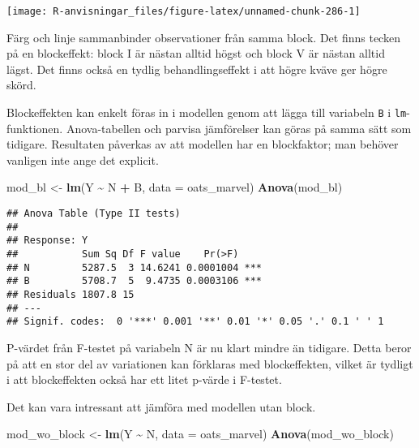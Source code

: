 \documentclass[
]{book}
\newenvironment{Shaded}{\begin{snugshade}}{\end{snugshade}}
\newcommand{\AttributeTok}[1]{\textcolor[rgb]{0.13,0.29,0.53}{#1}}
\newcommand{\FunctionTok}[1]{\textcolor[rgb]{0.13,0.29,0.53}{\textbf{#1}}}
\newcommand{\NormalTok}[1]{#1}
\newcommand{\OtherTok}[1]{\textcolor[rgb]{0.56,0.35,0.01}{#1}}
\newcommand{\SpecialCharTok}[1]{\textcolor[rgb]{0.81,0.36,0.00}{\textbf{#1}}}
\theoremstyle{definition}
\theoremstyle{definition}
\theoremstyle{definition}
\theoremstyle{definition}
\theoremstyle{remark}
\begin{document}
\begin{center}\texttt{[image: R-anvisningar\_files/figure-latex/unnamed-chunk-286-1]} \end{center}

Färg och linje sammanbinder observationer från samma block. Det finns tecken på en blockeffekt: block I är nästan alltid högst och block V är nästan alltid lägst. Det finns också en tydlig behandlingseffekt i att högre kväve ger högre skörd.

Blockeffekten kan enkelt föras in i modellen genom att lägga till variabeln \texttt{B} i \texttt{lm}-funktionen. Anova-tabellen och parvisa jämförelser kan göras på samma sätt som tidigare. Resultaten påverkas av att modellen har en blockfaktor; man behöver vanligen inte ange det explicit.

\begin{Shaded}
\begin{Highlighting}[]
\NormalTok{mod\_bl }\OtherTok{\textless{}{-}} \FunctionTok{lm}\NormalTok{(Y }\SpecialCharTok{\textasciitilde{}}\NormalTok{ N }\SpecialCharTok{+}\NormalTok{ B, }\AttributeTok{data =}\NormalTok{ oats\_marvel)}
\FunctionTok{Anova}\NormalTok{(mod\_bl)}
\end{Highlighting}
\end{Shaded}

\begin{verbatim}
## Anova Table (Type II tests)
## 
## Response: Y
##           Sum Sq Df F value    Pr(>F)    
## N         5287.5  3 14.6241 0.0001004 ***
## B         5708.7  5  9.4735 0.0003106 ***
## Residuals 1807.8 15                      
## ---
## Signif. codes:  0 '***' 0.001 '**' 0.01 '*' 0.05 '.' 0.1 ' ' 1
\end{verbatim}

P-värdet från F-testet på variabeln N är nu klart mindre än tidigare. Detta beror på att en stor del av variationen kan förklaras med blockeffekten, vilket är tydligt i att blockeffekten också har ett litet p-värde i F-testet.

Det kan vara intressant att jämföra med modellen utan block.

\begin{Shaded}
\begin{Highlighting}[]
\NormalTok{mod\_wo\_block }\OtherTok{\textless{}{-}} \FunctionTok{lm}\NormalTok{(Y }\SpecialCharTok{\textasciitilde{}}\NormalTok{ N, }\AttributeTok{data =}\NormalTok{ oats\_marvel)}
\FunctionTok{Anova}\NormalTok{(mod\_wo\_block)}
\end{Highlighting}
\end{Shaded}
\end{document}
